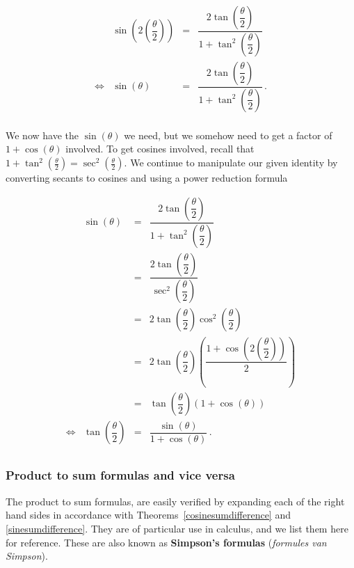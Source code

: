 \begin{example}
\[\begin{array}{rrcl}
&\sin\left(2 \left(\dfrac{\theta}{2}\right)\right) & = &  \dfrac{2\tan\left(\dfrac{\theta}{2}\right)}{1 + \tan^{2}\left(\dfrac{\theta}{2}\right)} \\ [15pt]
\Leftrightarrow&\sin(\theta) & = & \dfrac{2\tan\left(\dfrac{\theta}{2}\right)}{1 + \tan^{2}\left(\dfrac{\theta}{2}\right)}\,. \\ \end{array} \]

We now have the $\sin(\theta)$ we need, but we somehow need to get a factor of $1+\cos(\theta)$ involved.  To get cosines involved, recall that $1 + \tan^{2}\left(\frac{\theta}{2}\right) = \sec^{2}\left(\frac{\theta}{2}\right)$.  We continue to manipulate our given identity by converting secants to cosines and using a power reduction formula

\[ \begin{array}{rrcl} 

&\sin(\theta) & = &  \dfrac{2\tan\left(\dfrac{\theta}{2}\right)}{1 + \tan^{2}\left(\dfrac{\theta}{2}\right)} \\ [15pt]
& & = & \dfrac{2\tan\left(\dfrac{\theta}{2}\right)}{\sec^{2}\left(\dfrac{\theta}{2}\right)} \\ [15pt]
& & = & 2 \tan\left(\dfrac{\theta}{2}\right) \cos^{2}\left(\dfrac{\theta}{2}\right) \\ [5pt]
& & = & 2 \tan\left(\dfrac{\theta}{2}\right) \left(\dfrac{1 + \cos\left(2 \left(\dfrac{\theta}{2}\right)\right)}{2}\right) \\ [15pt]
& & = &  \tan\left(\dfrac{\theta}{2}\right) \left(1+\cos(\theta) \right) \\ [5pt]
\Leftrightarrow&\tan\left(\dfrac{\theta}{2}\right) & = & \dfrac{\sin(\theta)}{1+\cos(\theta)}\,. \\ 
\end{array}  \]


\end{example}
\fi

\subsubsection{Product to sum formulas and vice versa}
The product to sum formulas, are easily verified by expanding each of the right hand sides in accordance with Theorems~\ref{cosinesumdifference} and \ref{sinesumdifference}.  They are of particular use in calculus, and we list them here for reference. These are also known as \textbf{Simpson's formulas} (\textit{formules van Simpson}).  


